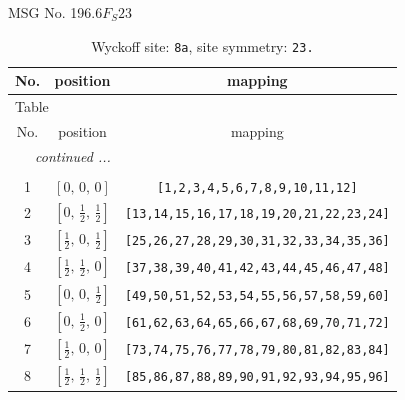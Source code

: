 \documentclass[fleqn,8pt]{jsarticle}
\begin{document}
\setcounter{MaxMatrixCols}{32}

\renewcommand{\tablename}{Table~}
\renewcommand{\figurename}{Figure~}
\begin{center}
\LARGE
MSG No. 196.6\quad$F_{S}23$
\end{center}
\renewcommand{\arraystretch}{1.2}
\begin{longtable}{ccc}
\caption{Wyckoff site: {\tt 8a}, site symmetry: {\tt 23.}}
 \\
 \hline \hline
No. & position & mapping \\ \hline \endfirsthead

\multicolumn{2}{l}{\tablename\ \thetable{}} \\
 \hline \hline
No. & position & mapping \\ \hline \endhead

 \hline \hline
\multicolumn{2}{r}{\footnotesize\it continued ...} \\ \endfoot

 \hline \hline
\multicolumn{2}{r}{} \\ \endlastfoot

1 & $\left[ 0,\, 0,\, 0 \right]$ & {\tt [1,2,3,4,5,6,7,8,9,10,11,12]} \\ \hline
2 & $\left[ 0,\, \frac{1}{2},\, \frac{1}{2} \right]$ & {\tt [13,14,15,16,17,18,19,20,21,22,23,24]} \\ \hline
3 & $\left[ \frac{1}{2},\, 0,\, \frac{1}{2} \right]$ & {\tt [25,26,27,28,29,30,31,32,33,34,35,36]} \\ \hline
4 & $\left[ \frac{1}{2},\, \frac{1}{2},\, 0 \right]$ & {\tt [37,38,39,40,41,42,43,44,45,46,47,48]} \\ \hline
5 & $\left[ 0,\, 0,\, \frac{1}{2} \right]$ & {\tt [49,50,51,52,53,54,55,56,57,58,59,60]} \\ \hline
6 & $\left[ 0,\, \frac{1}{2},\, 0 \right]$ & {\tt [61,62,63,64,65,66,67,68,69,70,71,72]} \\ \hline
7 & $\left[ \frac{1}{2},\, 0,\, 0 \right]$ & {\tt [73,74,75,76,77,78,79,80,81,82,83,84]} \\ \hline
8 & $\left[ \frac{1}{2},\, \frac{1}{2},\, \frac{1}{2} \right]$ & {\tt [85,86,87,88,89,90,91,92,93,94,95,96]} \\
\end{longtable}
\renewcommand{\arraystretch}{1.2}
\end{document}
